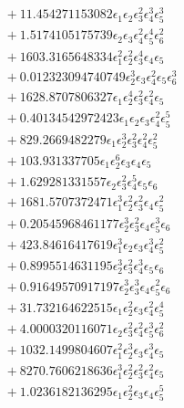 \documentclass[10pt]{article}
\begin{document}
\begin{align*}
&{}  + 11.454271153082 \epsilon_{1} \epsilon_{2} \epsilon_{3}^{2} \epsilon_{4}^{3} \epsilon_{5}^{3} \\
&{}  + 1.5174105175739 \epsilon_{2} \epsilon_{3} \epsilon_{4}^{2} \epsilon_{5}^{4} \epsilon_{6}^{2} \\
&{}  + 1603.3165648334 \epsilon_{1}^{2} \epsilon_{2}^{2} \epsilon_{3}^{4} \epsilon_{4} \epsilon_{5} \\
&{}  + 0.012323094740749 \epsilon_{2}^{3} \epsilon_{3} \epsilon_{4}^{2} \epsilon_{5} \epsilon_{6}^{3} \\
&{}  + 1628.8707806327 \epsilon_{1} \epsilon_{2}^{4} \epsilon_{3}^{2} \epsilon_{4}^{2} \epsilon_{5} \\
&{}  + 0.40134542972423 \epsilon_{1} \epsilon_{2} \epsilon_{3} \epsilon_{4}^{2} \epsilon_{5}^{5} \\
&{}  + 829.2669482279 \epsilon_{1} \epsilon_{2}^{3} \epsilon_{3}^{2} \epsilon_{4}^{2} \epsilon_{5}^{2} \\
&{}  + 103.931337705 \epsilon_{1} \epsilon_{2}^{6} \epsilon_{3} \epsilon_{4} \epsilon_{5} \\
&{}  + 1.629281331557 \epsilon_{2} \epsilon_{3}^{2} \epsilon_{4}^{5} \epsilon_{5} \epsilon_{6} \\
&{}  + 1681.5707372471 \epsilon_{1}^{3} \epsilon_{2}^{2} \epsilon_{3}^{2} \epsilon_{4} \epsilon_{5}^{2} \\
&{}  + 0.20545968461177 \epsilon_{2}^{3} \epsilon_{3}^{2} \epsilon_{4} \epsilon_{5}^{3} \epsilon_{6} \\
&{}  + 423.84616417619 \epsilon_{1}^{3} \epsilon_{2} \epsilon_{3} \epsilon_{4}^{3} \epsilon_{5}^{2} \\
&{}  + 0.8995514631195 \epsilon_{2}^{3} \epsilon_{3}^{2} \epsilon_{4}^{3} \epsilon_{5} \epsilon_{6} \\
&{}  + 0.91649570917197 \epsilon_{2}^{3} \epsilon_{3}^{3} \epsilon_{4} \epsilon_{5}^{2} \epsilon_{6} \\
&{}  + 31.732164622515 \epsilon_{1} \epsilon_{2}^{2} \epsilon_{3} \epsilon_{4}^{2} \epsilon_{5}^{4} \\
&{}  + 4.0000320116071 \epsilon_{2} \epsilon_{3}^{2} \epsilon_{4}^{2} \epsilon_{5}^{3} \epsilon_{6}^{2} \\
&{}  + 1032.1499804607 \epsilon_{1}^{2} \epsilon_{2}^{3} \epsilon_{3} \epsilon_{4}^{3} \epsilon_{5} \\
&{}  + 8270.7606218636 \epsilon_{1}^{3} \epsilon_{2}^{2} \epsilon_{3}^{2} \epsilon_{4}^{2} \epsilon_{5} \\
&{}  + 1.0236182136295 \epsilon_{1} \epsilon_{2}^{2} \epsilon_{3} \epsilon_{4} \epsilon_{5}^{5} \\

\end{align*}
\end{document}
